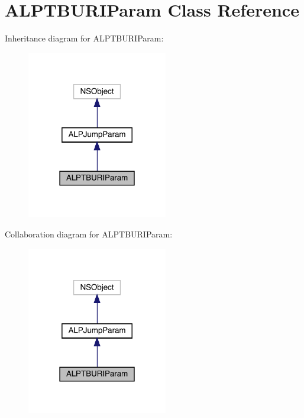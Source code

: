 \hypertarget{interface_a_l_p_t_b_u_r_i_param}{}\section{A\+L\+P\+T\+B\+U\+R\+I\+Param Class Reference}
\label{interface_a_l_p_t_b_u_r_i_param}


Inheritance diagram for A\+L\+P\+T\+B\+U\+R\+I\+Param\+:\nopagebreak
\begin{figure}[H]
\begin{center}
\leavevmode
\includegraphics[width=174pt]{interface_a_l_p_t_b_u_r_i_param__inherit__graph}
\end{center}
\end{figure}


Collaboration diagram for A\+L\+P\+T\+B\+U\+R\+I\+Param\+:\nopagebreak
\begin{figure}[H]
\begin{center}
\leavevmode
\includegraphics[width=174pt]{interface_a_l_p_t_b_u_r_i_param__coll__graph}
\end{center}
\end{figure}
